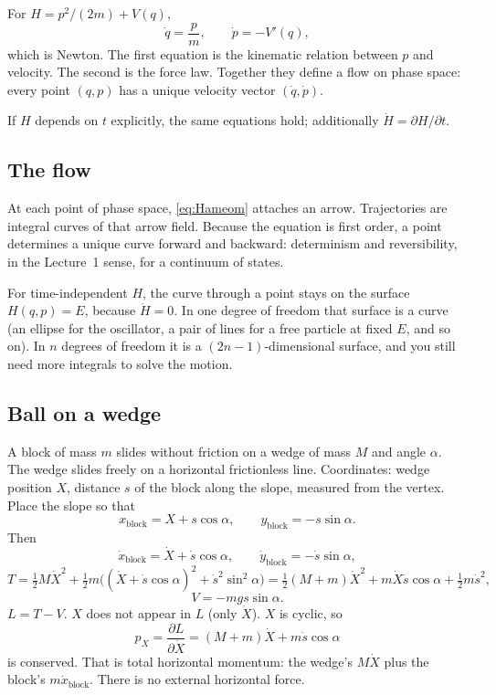 \documentclass[11pt]{article}
\numberwithin{equation}{section}
\newcommand{\qdot}{\dot{q}}
\newcommand{\pdot}{\dot{p}}
\newcommand{\pd}[2]{\frac{\partial #1}{\partial #2}}
\begin{document}
For $H=p^2/(2m)+V(q)$,
\[
\qdot = \frac{p}{m},\qquad \pdot = -V'(q),
\]
which is Newton. The first equation is the kinematic relation between $p$ and velocity. The second is the force law. Together they define a flow on phase space: every point $(q,p)$ has a unique velocity vector $(\qdot,\pdot)$.

If $H$ depends on $t$ explicitly, the same equations hold; additionally $\dot H=\partial H/\partial t$.

\subsection{The flow}

At each point of phase space, \eqref{eq:Hameom} attaches an arrow. Trajectories are integral curves of that arrow field. Because the equation is first order, a point determines a unique curve forward and backward: determinism and reversibility, in the Lecture~1 sense, for a continuum of states.

For time-independent $H$, the curve through a point stays on the surface $H(q,p)=E$, because $\dot H=0$. In one degree of freedom that surface is a curve (an ellipse for the oscillator, a pair of lines for a free particle at fixed $E$, and so on). In $n$ degrees of freedom it is a $(2n-1)$-dimensional surface, and you still need more integrals to solve the motion.

\subsection{Ball on a wedge}

A block of mass $m$ slides without friction on a wedge of mass $M$ and angle $\alpha$. The wedge slides freely on a horizontal frictionless line. Coordinates: wedge position $X$, distance $s$ of the block along the slope, measured from the vertex. Place the slope so that
\[
x_{\mathrm{block}} = X + s\cos\alpha,\qquad
y_{\mathrm{block}} = -s\sin\alpha.
\]
Then
\[
\dot x_{\mathrm{block}} = \dot X + \dot s\cos\alpha,\qquad
\dot y_{\mathrm{block}} = -\dot s\sin\alpha,
\]
\[
T = \tfrac12 M\dot X^2
+ \tfrac12 m\bigl((\dot X+\dot s\cos\alpha)^2 + \dot s^2\sin^2\alpha\bigr)
= \tfrac12(M+m)\dot X^2 + m\dot X\dot s\cos\alpha + \tfrac12 m\dot s^2,
\]
\[
V = -m g s\sin\alpha.
\]
$L=T-V$. $X$ does not appear in $L$ (only $\dot X$). $X$ is cyclic, so
\[
p_X = \pd{L}{\dot X} = (M+m)\dot X + m\dot s\cos\alpha
\]
is conserved. That is total horizontal momentum: the wedge's $M\dot X$ plus the block's $m\dot x_{\mathrm{block}}$. There is no external horizontal force.
\end{document}
